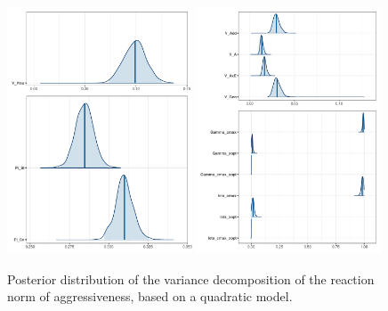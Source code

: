 \documentclass[a4paper,12pt,twoside]{article}
\begin{document}
\begin{figure}[t!b!]
  \includegraphics[width = 0.49\textwidth]{TPC_plas_ct.pdf}
  \includegraphics[width = 0.49\textwidth]{TPC_gen_ct.pdf}
  \caption{Posterior distribution of the variance decomposition of the reaction norm of aggressiveness, based on a quadratic model.}
  \label{fig_agr_var_decomp_ct}
\end{figure}
\end{document}
